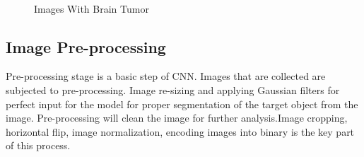 \documentclass[conference]{IEEEtran}
\begin{document}
\begin{figure} [htb]
\hfill
{} \hfill
{}\\
\hfill
{}\hfill
{}\hfill
\caption{\label{fig:samplesetup}Images With Brain Tumor}
\end{figure}


\subsection{Image Pre-processing}
Pre-processing stage is a basic step of CNN. Images that are collected are subjected to pre-processing. Image re-sizing and applying Gaussian filters for perfect input for the model for proper segmentation of the target object from the image. Pre-processing will clean the image for further analysis.Image cropping, horizontal flip, image normalization, encoding images into binary is the key part of this process. 
\end{document}
